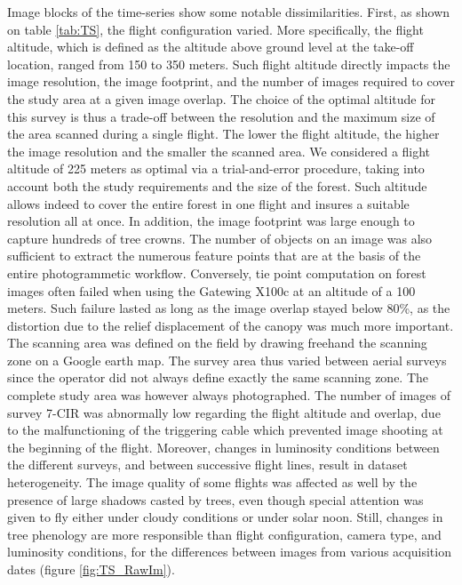 \documentclass[remotesensing,article,submit,moreauthors,pdftex,12pt,a4paper]{mdpi} %
\begin{document}
Image blocks of the time-series show some notable dissimilarities. 
First, as shown on table \ref{tab:TS}, the flight configuration varied. 
More specifically, the flight altitude, which is defined as the altitude above ground level at the take-off location, ranged from 150 to 350 meters. 
Such flight altitude directly impacts the image resolution, the image footprint, and the number of images required to cover the study area at a given image overlap. 
The choice of the optimal altitude for this survey is thus a trade-off between the resolution and the maximum size of the area scanned during a single flight. 
The lower the flight altitude, the higher the image resolution and the smaller the scanned area.
We considered a flight altitude of 225 meters as optimal via a trial-and-error procedure, taking into account both the study requirements and the size of the forest.
Such altitude allows indeed to cover the entire forest in one flight and insures a suitable resolution all at once.
In addition, the image footprint was large enough to capture hundreds of tree crowns. 
The number of objects on an image was also sufficient to extract the numerous feature points that are at the basis of the entire photogrammetic workflow. 
Conversely, tie point computation on forest images often failed when using the Gatewing X100c at an altitude of a 100 meters. Such failure lasted as long as the image overlap stayed below 80\%, as the distortion due to the relief displacement of the canopy was much more important. 
The scanning area was defined on the field by drawing freehand the scanning zone on a Google earth map. 
The survey area thus varied between aerial surveys since the operator did not always define exactly the same scanning zone. The complete study area was however always photographed. 
The number of images of survey 7-CIR was abnormally low regarding the flight altitude and overlap, due to the malfunctioning of the triggering cable which prevented image shooting at the beginning of the flight. 
Moreover, changes in luminosity conditions between the different surveys, and between successive flight lines, result in dataset heterogeneity. 
The image quality of some flights was affected as well by the presence of large shadows casted by trees, even though special attention was given to fly either under cloudy conditions or under solar noon. 
Still, changes in tree phenology are more responsible than flight configuration, camera type, and luminosity conditions, for the differences between images from various acquisition dates (figure \ref{fig:TS_RawIm}).
\end{document}
